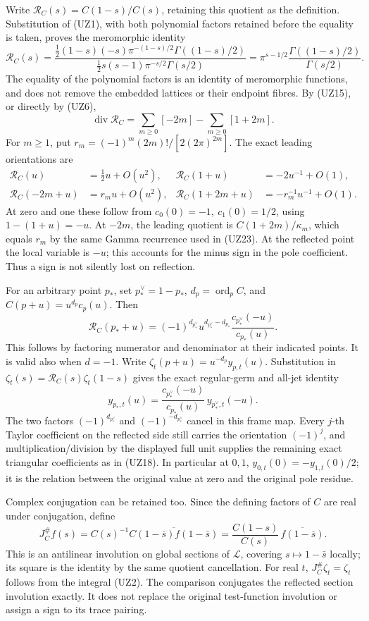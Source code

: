 \documentclass[
  10pt,
  a4paper,
]{article}
\begin{document}
Write \(\mathcal R_C(s)=C(1-s)/C(s)\), retaining this quotient as the
definition. Substitution of (UZ1), with both polynomial factors retained
before the equality is taken, proves the meromorphic identity \[
\mathcal R_C(s)=
\frac{\frac12(1-s)(-s)\pi^{-(1-s)/2}\Gamma((1-s)/2)}
{\frac12s(s-1)\pi^{-s/2}\Gamma(s/2)}
=\pi^{s-1/2}\frac{\Gamma((1-s)/2)}{\Gamma(s/2)}.
\tag{UZ47}
\] The equality of the polynomial factors is an identity of meromorphic
functions, and does not remove the embedded lattices or their endpoint
fibres. By (UZ15), or directly by (UZ6), \[
\operatorname{div}\mathcal R_C
=\sum_{m\ge0}[-2m]-\sum_{m\ge0}[1+2m].
\tag{UZ48}
\] For \(m\ge1\), put \(r_m=(-1)^m(2m)!/[2(2\pi)^{2m}]\). The exact
leading orientations are \[
\begin{aligned}
\mathcal R_C(u)&=\tfrac12u+O(u^2),&
\mathcal R_C(1+u)&=-2u^{-1}+O(1),\\
\mathcal R_C(-2m+u)&=r_mu+O(u^2),&
\mathcal R_C(1+2m+u)&=-r_m^{-1}u^{-1}+O(1).
\end{aligned}\tag{UZ49}
\] At zero and one these follow from \(c_0(0)=-1,\ c_1(0)=1/2\), using
\(1-(1+u)=-u\). At \(-2m\), the leading quotient is
\(C(1+2m)/\kappa_m\), which equals \(r_m\) by the same Gamma recurrence
used in (UZ23). At the reflected point the local variable is \(-u\);
this accounts for the minus sign in the pole coefficient. Thus a sign is
not silently lost on reflection.

For an arbitrary point \(p_*\), set \(p_*^\vee=1-p_*\),
\(d_p=\operatorname{ord}_p C\), and \(C(p+u)=u^{d_p}c_p(u)\). Then \[
\mathcal R_C(p_*+u)
=(-1)^{d_{p_*^\vee}}u^{d_{p_*^\vee}-d_{p_*}}
\frac{c_{p_*^\vee}(-u)}{c_{p_*}(u)}.
\tag{UZ50}
\] This follows by factoring numerator and denominator at their
indicated points. It is valid also when \(d=-1\). Write
\(\zeta_t(p+u)=u^{-d_p}y_{p,t}(u)\). Substitution in
\(\zeta_t(s)=\mathcal R_C(s)\zeta_t(1-s)\) gives the exact regular-germ
and all-jet identity \[
y_{p_*,t}(u)
=\frac{c_{p_*^\vee}(-u)}{c_{p_*}(u)}\,y_{p_*^\vee,t}(-u).
\tag{UZ51}
\] The two factors \((-1)^{d_{p_*^\vee}}\) and \((-1)^{-d_{p_*^\vee}}\)
cancel in this frame map. Every \(j\)-th Taylor coefficient on the
reflected side still carries the orientation \((-1)^j\), and
multiplication/division by the displayed full unit supplies the
remaining exact triangular coefficients as in (UZ18). In particular at
\(0,1\), \(y_{0,t}(0)=-y_{1,t}(0)/2\); it is the relation between the
original value at zero and the original pole residue.

Complex conjugation can be retained too. Since the defining factors of
\(C\) are real under conjugation, define \[
J_C^\# f(s)=C(s)^{-1}
\overline{C(1-\bar s)f(1-\bar s)}
=\frac{C(1-s)}{C(s)}\,\overline{f(1-\bar s)}.
\tag{UZ52}
\] This is an antilinear involution on global sections of
\(\mathcal L\), covering \(s\mapsto1-\bar s\) locally; its square is the
identity by the same quotient cancellation. For real \(t\),
\(J_C^\#\zeta_t=\zeta_t\) follows from the integral (UZ2). The
comparison conjugates the reflected section involution exactly. It does
not replace the original test-function involution or assign a sign to
its trace pairing.
\end{document}
